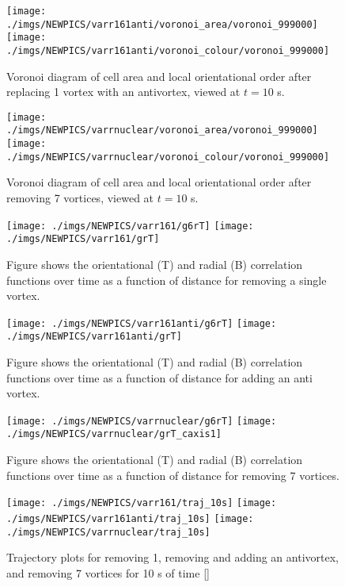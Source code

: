 \begin{figure}[htb]
    \texttt{[image: ./imgs/NEWPICS/varr161anti/voronoi\_area/voronoi\_999000]}
    \texttt{[image: ./imgs/NEWPICS/varr161anti/voronoi\_colour/voronoi\_999000]}
    \caption{Voronoi diagram of cell area and local orientational order after replacing 1 vortex with an antivortex, viewed at $t=10$ s.}
\end{figure}
\begin{figure}[htb]
    \texttt{[image: ./imgs/NEWPICS/varrnuclear/voronoi\_area/voronoi\_999000]}
    \texttt{[image: ./imgs/NEWPICS/varrnuclear/voronoi\_colour/voronoi\_999000]}
    \caption{Voronoi diagram of cell area and local orientational order after removing 7 vortices, viewed at $t=10$ s.}
\end{figure}
\begin{figure}[htb]
    \texttt{[image: ./imgs/NEWPICS/varr161/g6rT]}
    \texttt{[image: ./imgs/NEWPICS/varr161/grT]}
    \caption{Figure shows the orientational (T) and radial (B) correlation functions over time as a function of distance for removing a single vortex.}
\end{figure}
\begin{figure}[htb]
    \texttt{[image: ./imgs/NEWPICS/varr161anti/g6rT]}
    \texttt{[image: ./imgs/NEWPICS/varr161anti/grT]}
    \caption{Figure shows the orientational (T) and radial (B) correlation functions over time as a function of distance for adding an anti vortex.}
\end{figure}
\begin{figure}[htb]
    \texttt{[image: ./imgs/NEWPICS/varrnuclear/g6rT]}
    \texttt{[image: ./imgs/NEWPICS/varrnuclear/grT\_caxis1]}
    \caption{Figure shows the orientational (T) and radial (B) correlation functions over time as a function of distance for removing 7 vortices.}
\end{figure}
\begin{figure}[htb]
    \texttt{[image: ./imgs/NEWPICS/varr161/traj\_10s]}
    \texttt{[image: ./imgs/NEWPICS/varr161anti/traj\_10s]}
    \texttt{[image: ./imgs/NEWPICS/varrnuclear/traj\_10s]}
    \caption{Trajectory plots for removing 1, removing and adding an antivortex, and removing 7 vortices for 10 s of time []}
\end{figure}
